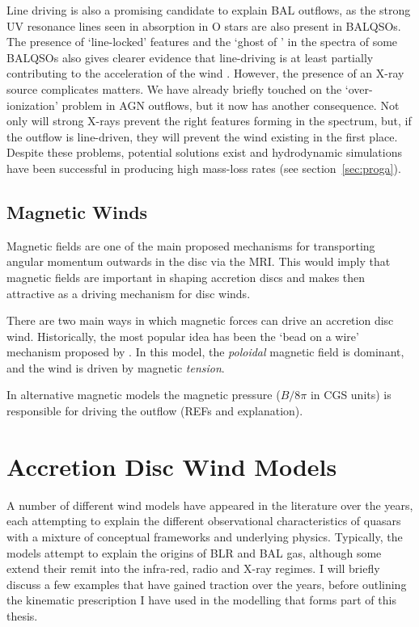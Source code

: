 Line driving is also a promising candidate to explain BAL outflows, as
the strong UV resonance lines seen in absorption in O stars are also 
present in BALQSOs. The presence of `line-locked' features \citep{bowler2014} 
and the `ghost of \la' \citep{arav1995, arav1996, north2006}
in the spectra of some BALQSOs also gives clearer evidence that line-driving is
at least partially contributing to the acceleration of the wind 
\citep[but see also][]{cottis2010}.
However, the presence of an X-ray source complicates matters.
We have already briefly touched on the `over-ionization' problem
in AGN outflows, but it now has another consequence. Not only will 
strong X-rays prevent the right features forming in the spectrum, but, if
the outflow is line-driven, they will prevent the wind existing in the first 
place. Despite these problems, potential solutions exist and hydrodynamic
simulations have been successful in producing high mass-loss rates 
(see section~\ref{sec:proga}).

\subsection{Magnetic Winds}
\label{sec:mag_winds}

Magnetic fields are one of the main proposed mechanisms for transporting
angular momentum outwards in the disc via the MRI. This would imply
that magnetic fields are important in shaping accretion discs and makes
then attractive as a driving mechanism for disc winds.

There are two main ways in which magnetic forces can drive an 
accretion disc wind. Historically, the most popular idea has been the `bead on a wire' mechanism proposed by \citep{blandfordpayne}. In this model,
the {\em poloidal} magnetic field is dominant, and the wind is driven by magnetic
{\em tension}. 

In alternative magnetic models the magnetic pressure ($B/8\pi$ in CGS units)
is responsible for driving the outflow (REFs and explanation).

\section{Accretion Disc Wind Models}
\label{sec:wind_models}

A number of different wind models have appeared in the literature over the 
years, each attempting to explain the different observational characteristics
of quasars with a mixture of conceptual frameworks and underlying physics. 
Typically, the models attempt to explain the origins of BLR and BAL gas, although
some extend their remit into the infra-red, radio and X-ray regimes.
I will briefly discuss a few examples that have gained traction over the years,
before outlining the kinematic prescription I have used in the modelling that forms 
part of this thesis. 

